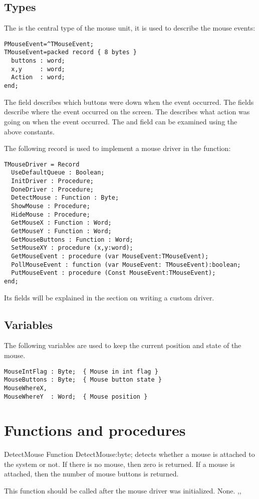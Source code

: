 \subsection{Types}
The  is the central type of the mouse unit, it is used
to describe the mouse events:
\begin{verbatim}
PMouseEvent=^TMouseEvent;
TMouseEvent=packed record { 8 bytes }
  buttons : word;
  x,y     : word;
  Action  : word;
end;
\end{verbatim}
The  field describes which buttons were down when the event
occurred. The  fields describe where the event occurred on the
screen. The  describes what action was going on when the event
occurred. The  and  field can be examined using the
above constants.

The following record is used to implement a mouse driver in the
 function:
\begin{verbatim}
TMouseDriver = Record 
  UseDefaultQueue : Boolean;
  InitDriver : Procedure;
  DoneDriver : Procedure;
  DetectMouse : Function : Byte;
  ShowMouse : Procedure;
  HideMouse : Procedure;
  GetMouseX : Function : Word;
  GetMouseY : Function : Word;
  GetMouseButtons : Function : Word;
  SetMouseXY : procedure (x,y:word);
  GetMouseEvent : procedure (var MouseEvent:TMouseEvent);
  PollMouseEvent : function (var MouseEvent: TMouseEvent):boolean;
  PutMouseEvent : procedure (Const MouseEvent:TMouseEvent); 
end;
\end{verbatim}
Its fields will be explained in the section on writing a custom driver.

\subsection{Variables}
The following variables are used to keep the current position and state of
the mouse.
\begin{verbatim}
MouseIntFlag : Byte;  { Mouse in int flag }
MouseButtons : Byte;  { Mouse button state }
MouseWhereX,
MouseWhereY  : Word;  { Mouse position }
\end{verbatim}

\section{Functions and procedures}

\begin{function}{DetectMouse}
\Declaration
Function DetectMouse:byte;
\Description
{} detects whether a mouse is attached to the system or not.
If there is no mouse, then zero is returned. If a mouse is attached, then
the number of mouse buttons is returned.

This function should be called after the mouse driver was initialized.
\Errors
None.
\SeeAlso
{},,
\end{function}

